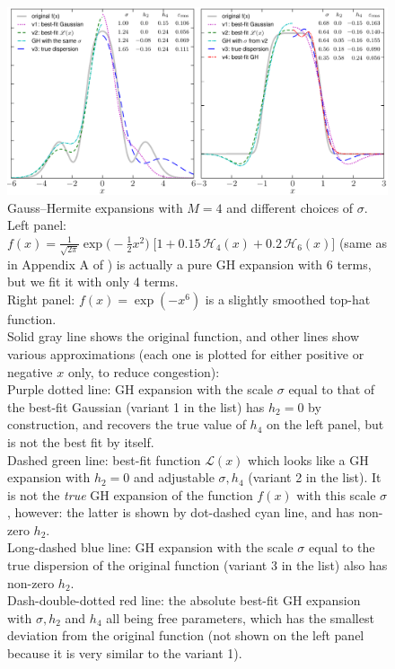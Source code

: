 \documentclass[12pt]{article}
\begin{document}
\begin{figure}
\begin{center}
\includegraphics[width=16.5cm]{GHmoments.pdf}
\end{center}
\caption{Gauss--Hermite expansions with $M=4$ and different choices of $\sigma$. \protect\\
Left panel: $f(x) = \frac{1}{\sqrt{2\pi}} \exp\big(-\frac{1}{2} x^2 \big) \;\big[1 + 0.15\, \mathcal H_4(x) + 0.2\, \mathcal H_6(x) \big]$ (same as in Appendix A of \cite{Joseph2001}) is actually a pure GH expansion with 6 terms, but we fit it with only 4 terms. \protect\\
Right panel: $f(x) = \exp(-x^6)$ is a slightly smoothed top-hat function. \protect\\
Solid gray line shows the original function, and other lines show various approximations (each one is plotted for either positive or negative $x$ only, to reduce congestion): \protect\\
Purple dotted line: GH expansion with the scale $\sigma$ equal to that of the best-fit Gaussian (variant 1 in the list) has $h_2=0$ by construction, and recovers the true value of $h_4$ on the left panel, but is not the best fit by itself.\protect\\
Dashed green line: best-fit function $\mathscr L(x)$ which looks like a GH expansion with $h_2=0$ and adjustable $\sigma,h_4$ (variant 2 in the list). It is not the \textit{true} GH expansion of the function $f(x)$ with this scale $\sigma$, however: the latter is shown by dot-dashed cyan line, and has non-zero $h_2$.\protect\\
Long-dashed blue line: GH expansion with the scale $\sigma$ equal to the true dispersion of the original function (variant 3 in the list) also has non-zero $h_2$.\protect\\
Dash-double-dotted red line: the absolute best-fit GH expansion with $\sigma, h_2$ and $h_4$ all being free parameters, which has the smallest deviation from the original function (not shown on the left panel because it is very similar to the variant 1).
} \label{fig:GHmoments}
\end{figure}
\end{document}
